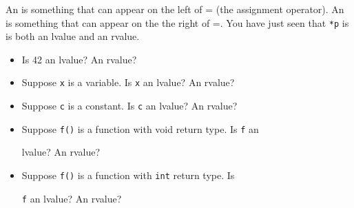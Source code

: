An  is something that can appear on the left of = (the assignment operator). An  is something that can appear on the the right of =. You have just seen that \texttt{*p} is is both an lvalue and an rvalue.

\begin{itemize}



\item

  Is 42 an lvalue? An rvalue?

\item

  Suppose \texttt{x} is a variable. Is \texttt{x} an lvalue? An rvalue?

\item

  Suppose \texttt{c} is a constant. Is \texttt{c} an lvalue? An rvalue?

\item

  Suppose \texttt{f()} is a function with void return type. Is \texttt{f} an

  lvalue? An rvalue?

\item

  Suppose \texttt{f()} is a function with \texttt{int} return type. Is

  \texttt{f} an lvalue? An rvalue?

\end{itemize}

